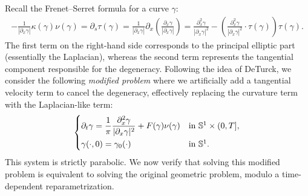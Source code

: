 \documentclass{article}
\theoremstyle{remark}
\theoremstyle{definition}
\numberwithin{equation}{section}
\begin{document}
Recall the Frenet--Serret formula for a curve $\gamma$:
\begin{align*}
    -\frac{1}{|\partial_x\gamma|}\kappa(\gamma)\nu(\gamma)
    = \partial_s\tau(\gamma)
    = \frac{1}{|\partial_x\gamma|}\partial_x\left(\frac{\partial_x\gamma}{|\partial_x\gamma|}\right)
    = \frac{\partial_x^2\gamma}{|\partial_x\gamma|^2} - \left(\frac{\partial_x^2\gamma}{|\partial_x\gamma|^2}\cdot\tau(\gamma)\right)\tau(\gamma).
\end{align*}
The first term on the right-hand side corresponds to the principal elliptic part (essentially the Laplacian), whereas the second term represents the tangential component responsible for the degeneracy.
Following the idea of DeTurck, we consider the following \textit{modified problem} where we artificially add a tangential velocity term to cancel the degeneracy, effectively replacing the curvature term with the Laplacian-like term:
\begin{equation}
    \begin{dcases*}
        \partial_t\gamma = \frac{1}{\pi}\frac{\partial_x^2\gamma}{|\partial_x\gamma|^2} + F(\gamma)\nu(\gamma) & in $\mathbb{S}^1\times(0,T]$,\\
        \gamma(\cdot,0) = \gamma_0(\cdot) & in $\mathbb{S}^1$.
    \end{dcases*}
    \label{eq:Langmuir_rewrite}
\end{equation}
This system is strictly parabolic. We now verify that solving this modified problem is equivalent to solving the original geometric problem, modulo a time-dependent reparametrization.
\end{document}
